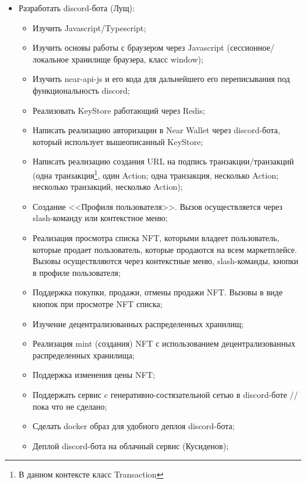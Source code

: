 \begin{itemize}
\begin{itemize}
    \end{itemize}
    \item Разработать discord-бота (Лущ):
    \begin{itemize}
        \item Изучить Javascript/Typescript;
        \item Изучить основы работы с браузером через Javascript (сессионное/локальное хранилище браузера, класс window);
        \item Изучить near-api-js и его кода для дальнейшего его переписывания под функциональность discord;
        \item Реализовать KeyStore\cite{nearclasskeystore} работающий через Redis\cite{redis};
        \item Написать реализацию авторизации в Near Wallet\cite{nearwallet} через discord-бота, который использует вышеописанный KeyStore;
        \item Написать реализацию создания URL на подпись транзакции/транзакций (одна транзакция\footnote{В данном контексте класс Transaction\cite{nearclasstransaction}}, один Action\cite{nearclassaction}; одна транзакция, несколько Action; несколько транзакций, несколько Action);
        \item Создание <<Профиля пользователя>>. Вызов осуществляется через slash-команду\cite{discordjsslashcommands} или контекстное меню;
        \item Реализация просмотра списка NFT, которыми владеет пользователь, которые продает пользователь, которые продаются на всем маркетплейсе. Вызовы осуществляются через контекстные меню, slash-команды, кнопки в профиле пользователя;
        \item Поддержка покупки, продажи, отмены продажи NFT. Вызовы в виде кнопок при просмотре NFT списка;
        \item Изучение децентрализованных распределенных хранилищ;
        \item Реализация mint (создания) NFT с использованием децентрализованных распределенных хранилища;
        \item Поддержка изменения цены NFT;
        \item Поддержать сервис c генеративно-состязательной сетью в discord-боте // пока что не сделано;
        \item Сделать docker образ для удобного деплоя discord-бота;
        \item Деплой discord-бота на облачный сервис (Кусиденов);
    \end{itemize}

\end{itemize}

